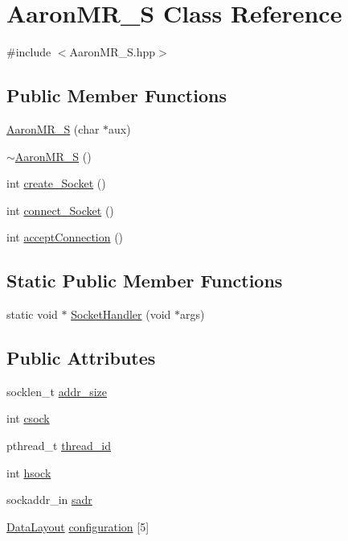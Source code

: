 \hypertarget{classAaronMR__S}{
\section{AaronMR\_\-S Class Reference}
\label{classAaronMR__S}
}


{\ttfamily \#include $<$AaronMR\_\-S.hpp$>$}

\subsection*{Public Member Functions}
\begin{DoxyCompactItemize}
\item 
\hyperlink{classAaronMR__S_a1c4c6e2d89d0d072b5b9f9130da074dd}{AaronMR\_\-S} (char $\ast$aux)
\item 
\hyperlink{classAaronMR__S_a56d7f2d8650052b514c5d74234f62526}{$\sim$AaronMR\_\-S} ()
\item 
int \hyperlink{classAaronMR__S_a978dc68a4d0326f3fe5972b788ceb2f7}{create\_\-Socket} ()
\item 
int \hyperlink{classAaronMR__S_a0eb15df9fca93e1007970755c4422f5b}{connect\_\-Socket} ()
\item 
int \hyperlink{classAaronMR__S_a5daabac4994c644a13360acdbadec63e}{acceptConnection} ()
\end{DoxyCompactItemize}
\subsection*{Static Public Member Functions}
\begin{DoxyCompactItemize}
\item 
static void $\ast$ \hyperlink{classAaronMR__S_ae8cc107d9d4a69cd9255c5246b7e3ae7}{SocketHandler} (void $\ast$args)
\end{DoxyCompactItemize}
\subsection*{Public Attributes}
\begin{DoxyCompactItemize}
\item 
socklen\_\-t \hyperlink{classAaronMR__S_ac76a524ef01d6ad627cf75d0a0ac1a23}{addr\_\-size}
\item 
int \hyperlink{classAaronMR__S_a03edb63f6a885fa9bb6746be9692fe23}{csock}
\item 
pthread\_\-t \hyperlink{classAaronMR__S_a58140066fda1aa3675f4458ab992f868}{thread\_\-id}
\item 
int \hyperlink{classAaronMR__S_ab5a2d2bd18b9d5d89a2461db95b25447}{hsock}
\item 
sockaddr\_\-in \hyperlink{classAaronMR__S_a4042c0d819c65c5d5e4d2e466b08af05}{sadr}
\item 
\hyperlink{structDataLayout}{DataLayout} \hyperlink{classAaronMR__S_ae216ad357a36cfd9c656ea24f500ea47}{configuration} \mbox{[}5\mbox{]}
\end{DoxyCompactItemize}


